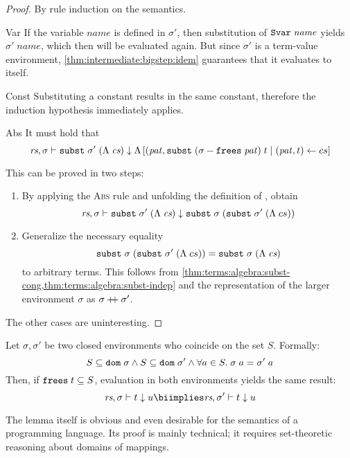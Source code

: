 \begin{proof}
  By rule induction on the semantics.

  \begin{induction}
    \item[Var]
      If the variable $\mathit{name}$ is defined in $\sigma'$, then substitution of $\texttt{\textup{Svar}}\;\mathit{name}$ yields $\sigma'\;\mathit{name}$, which then will be evaluated again.
      But since $\sigma'$ is a term-value environment, \cref{thm:intermediate:bigstep:idem} guarantees that it evaluates to itself.
    \item[Const]
      Substituting a constant results in the same constant, therefore the induction hypothesis immediately applies.
    \item[Abs]
      It must hold that
      \[
        \textit{rs}, \sigma \vdash \texttt{\textup{subst}}\;\sigma'\;(\Lambda\;\textit{cs}) \downarrow \Lambda \left[ (\mathit{pat}, \texttt{\textup{subst}}\;(\sigma - \texttt{\textup{frees}}\;\mathit{pat})\;t \mid (\mathit{pat}, t) \leftarrow cs \right]
      \]

      This can be proved in two steps:
      \begin{enumerate}
        \item
          By applying the \textsc{Abs} rule and unfolding the definition of , obtain
          \[\textit{rs}, \sigma \vdash \texttt{\textup{subst}}\;\sigma'\;(\Lambda\;\textit{cs}) \downarrow \texttt{\textup{subst}}\;\sigma\;(\texttt{\textup{subst}}\;\sigma'\;(\Lambda\;cs))\]
        \item
          Generalize the necessary equality
          \[\texttt{\textup{subst}}\;\sigma\;(\texttt{\textup{subst}}\;\sigma'\;(\Lambda\;cs)) = \texttt{\textup{subst}}\;\sigma\;(\Lambda\;\textit{cs})\]
          to arbitrary terms.
          This follows from \cref{thm:terms:algebra:subst-cong,thm:terms:algebra:subst-indep} and the representation of the larger environment $\sigma$ as $\sigma \mathbin{+\!\!+} \sigma'$.
      \end{enumerate}
  \end{induction}

  \noindent
  The other cases are uninteresting.
\end{proof}

\begin{lemma}\label{thm:intermediate:bigstep:agree}
  Let $\sigma, \sigma'$ be two closed environments who coincide on the set $S$. Formally:
  \[ S\subseteq \texttt{\textup{dom}}\;\sigma \wedge S\subseteq \texttt{\textup{dom}}\;\sigma' \wedge \forall a \in S.\;\sigma\;a = \sigma'\;a \]
  Then, if $\texttt{\textup{frees}}\;t \subseteq S$, evaluation in both environments yields the same result:
  \[\seval\rs\sigma{t}{u} \biimplies \seval\rs{\sigma'}{t}{u} \]
\end{lemma}

\noindent
The lemma itself is obvious and even desirable for the semantics of a programming language.
Its proof is mainly technical; it requires set-theoretic reasoning about domains of mappings.